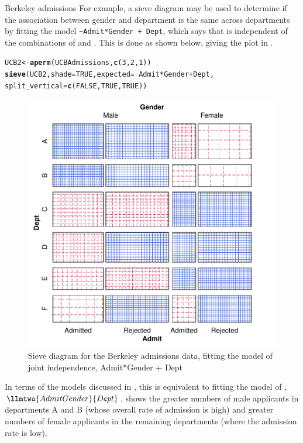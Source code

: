 \documentclass[11pt]{book}\usepackage[]{graphicx}\usepackage[]{color}
\makeatletter
\newcommand{\hlnum}[1]{\textcolor[rgb]{0.686,0.059,0.569}{#1}}%
\newcommand{\hlopt}[1]{\textcolor[rgb]{0,0,0}{#1}}%
\newcommand{\hlstd}[1]{\textcolor[rgb]{0.345,0.345,0.345}{#1}}%
\newcommand{\hlkwb}[1]{\textcolor[rgb]{0.69,0.353,0.396}{#1}}%
\newcommand{\hlkwc}[1]{\textcolor[rgb]{0.333,0.667,0.333}{#1}}%
\newcommand{\hlkwd}[1]{\textcolor[rgb]{0.737,0.353,0.396}{\textbf{#1}}}%
\newenvironment{kframe}{%
 \def\at@end@of@kframe{}%
 \ifinner\ifhmode%
  \def\at@end@of@kframe{\end{minipage}}%
  \begin{minipage}{\columnwidth}%
 \fi\fi%
 \def\FrameCommand##1{\hskip\@totalleftmargin \hskip-\fboxsep
 \colorbox{shadecolor}{##1}\hskip-\fboxsep
     \hskip-\linewidth \hskip-\@totalleftmargin \hskip\columnwidth}%
 \MakeFramed {\advance\hsize-\width
   \@totalleftmargin\z@ \linewidth\hsize
   \@setminipage}}%
 {\par\unskip\endMakeFramed%
 \at@end@of@kframe}
\newenvironment{knitrout}{}{} %
\renewenvironment{knitrout}{\small\renewcommand{\baselinestretch}{.85}}{} %
\makeatother
\begin{document}
\begin{Example}[berkeley3]{Berkeley admissions}
For example, a sieve diagram may be used to determine if the association
between gender and department is the same across departments
by fitting the model \verb|~Admit*Gender + Dept|, which
says that  is independent of the combinations of 
and .  This is done as shown below, giving the plot in
.

\begin{knitrout}
\color{fgcolor}\begin{kframe}
\begin{alltt}
\hlstd{UCB2} \hlkwb{<-} \hlkwd{aperm}\hlstd{(UCBAdmissions,} \hlkwd{c}\hlstd{(}\hlnum{3}\hlstd{,}\hlnum{2}\hlstd{,}\hlnum{1}\hlstd{))}
\hlkwd{sieve}\hlstd{(UCB2,} \hlkwc{shade}\hlstd{=}\hlnum{TRUE}\hlstd{,} \hlkwc{expected}\hlstd{=}\hlopt{~}\hlstd{Admit}\hlopt{*}\hlstd{Gender} \hlopt{+} \hlstd{Dept,}
      \hlkwc{split_vertical}\hlstd{=}\hlkwd{c}\hlstd{(}\hlnum{FALSE}\hlstd{,}\hlnum{TRUE}\hlstd{,}\hlnum{TRUE}\hlstd{))}
\end{alltt}
\end{kframe}\begin{figure}[htbp]


\centerline{\includegraphics[width=.6\textwidth]{ch04/fig/berkeley-sieve2} }

\caption[Sieve diagram for the Berkeley admissions data, fitting the model of joint independence, Admit*Gender + Dept]{Sieve diagram for the Berkeley admissions data, fitting the model of joint independence, Admit*Gender + Dept\label{fig:berkeley-sieve2}}
\end{figure}


\end{knitrout}

In terms of the \loglin models discussed in
, this is equivalent to fitting the model
of , $\llmtwo{AdmitGender}{Dept}$.
 shows the greater numbers of
male applicants in departments A and B
(whose overall rate of admission is high) and greater numbers of female
applicants in the remaining departments (where the admission rate is low).

\end{Example}
\end{document}
